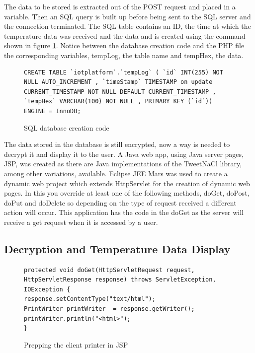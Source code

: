 The data to be stored is extracted out of the POST request and placed in a variable. Then an SQL query is built up before being sent to the SQL server and the connection terminated. The SQL table contains an ID, the time at which the temperature data was received and the data and is created using the command shown in figure \ref{snip:sql}. Notice between the database creation code and the PHP file the corresponding variables, tempLog, the table name and tempHex, the data.

\begin{figure}[H]
\begin{lstlisting}[style=SQL]
CREATE TABLE `iotplatform`.`tempLog` ( `id` INT(255) NOT NULL AUTO_INCREMENT , `timeStamp` TIMESTAMP on update CURRENT_TIMESTAMP NOT NULL DEFAULT CURRENT_TIMESTAMP , `tempHex` VARCHAR(100) NOT NULL , PRIMARY KEY (`id`)) ENGINE = InnoDB;
\end{lstlisting}
\caption{SQL database creation code}
\label{snip:sql}
\end{figure}

The data stored in the database is still encrypted, now a way is needed to decrypt it and display it to the user. A Java web app, using Java server pages, JSP, was created as there are Java implementations of the TweetNaCl library, among other variations, available\cite{ian}. Eclipse JEE Mars was used to create a dynamic web project which extends HttpServlet for the creation of dynamic web pages. In this you override at least one of the following methods, doGet, doPost, doPut and doDelete so depending on the type of request received a different action will occur. This application has the code in the doGet as the server will receive a get request when it is accessed by a user.

\subsection{Decryption and Temperature Data Display}

\begin{figure}[H]
\begin{lstlisting}[style=Java]
protected void doGet(HttpServletRequest request, HttpServletResponse response) throws ServletException, IOException {
response.setContentType("text/html");
PrintWriter printWriter  = response.getWriter();
printWriter.println("<html>");
}
\end{lstlisting}
\caption{Prepping the client printer in JSP}
\label{snip:clientprinterjsp}
\end{figure}

